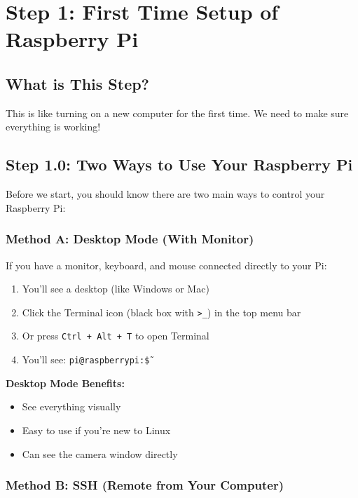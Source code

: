 \documentclass[12pt,a4paper]{article}
\begin{document}
\section{Step 1: First Time Setup of Raspberry Pi}

\subsection{What is This Step?}

This is like turning on a new computer for the first time. We need to make sure everything is working!

\subsection{Step 1.0: Two Ways to Use Your Raspberry Pi}

Before we start, you should know there are two main ways to control your Raspberry Pi:

\subsubsection{Method A: Desktop Mode (With Monitor)}

If you have a monitor, keyboard, and mouse connected directly to your Pi:

\begin{enumerate}
    \item You'll see a desktop (like Windows or Mac)
    \item Click the Terminal icon (black box with \texttt{>\_}) in the top menu bar
    \item Or press \texttt{Ctrl + Alt + T} to open Terminal
    \item You'll see: \texttt{pi@raspberrypi:\~\$}
\end{enumerate}

\begin{infobox}
\textbf{Desktop Mode Benefits:}
\begin{itemize}
    \item See everything visually
    \item Easy to use if you're new to Linux
    \item Can see the camera window directly
\end{itemize}
\end{infobox}

\subsubsection{Method B: SSH (Remote from Your Computer)}
\end{document}
